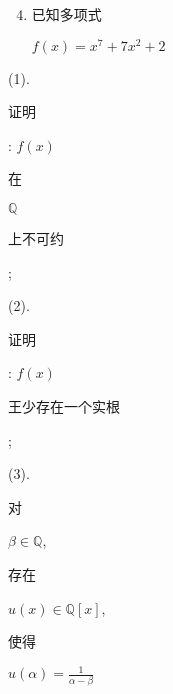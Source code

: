 \documentclass[10pt]{article}
\begin{document}
\begin{enumerate}
  \setcounter{enumi}{3}
  \item \begin{CJK}{UTF8}{mj}已知多项式\end{CJK} $f(x)=x^{7}+7 x^{2}+2$
\end{enumerate}
(1). \begin{CJK}{UTF8}{mj}证明\end{CJK}: $f(x)$ \begin{CJK}{UTF8}{mj}在\end{CJK} $\mathbb{Q}$ \begin{CJK}{UTF8}{mj}上不可约\end{CJK};

(2). \begin{CJK}{UTF8}{mj}证明\end{CJK}: $f(x)$ \begin{CJK}{UTF8}{mj}王少存在一个实根\end{CJK};

(3). \begin{CJK}{UTF8}{mj}对\end{CJK} $\beta \in \mathbb{Q}$, \begin{CJK}{UTF8}{mj}存在\end{CJK} $u(x) \in \mathbb{Q}[x]$, \begin{CJK}{UTF8}{mj}使得\end{CJK} $u(\alpha)=\frac{1}{\alpha-\beta}$
\end{document}
